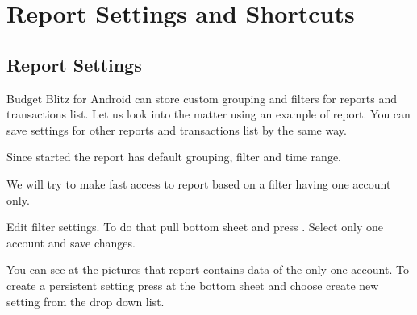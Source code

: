 \documentclass[a4paper,10pt,english]{sphinxmanual}
\begin{document}
\chapter{Report Settings and Shortcuts}
\label{\detokenize{shortcuts:report-settings-and-shortcuts}}\label{\detokenize{shortcuts:chapter-shortcuts}}\label{\detokenize{shortcuts::doc}}

\section{Report Settings}
\label{\detokenize{shortcuts:report-settings}}
Budget Blitz for Android can store custom grouping and filters for reports and transactions list. Let us
look into the matter using an example of  report. You can save
settings for other reports and transactions list by the same way.

Since started the report has default grouping, filter and time range.

\noindent{}
\noindent{}
\noindent{}

We will try to make fast access to  report based on a filter having one account only.

Edit filter settings. To do that pull bottom sheet and press . Select only one account
and save changes.

\noindent{}
\noindent{}
\noindent{}

You can see at the pictures that report contains data of the only one account. To create
a persistent setting press  at the bottom sheet
and choose create new setting from the drop down list.

\noindent{}
\noindent{}
\noindent{}
\end{document}

